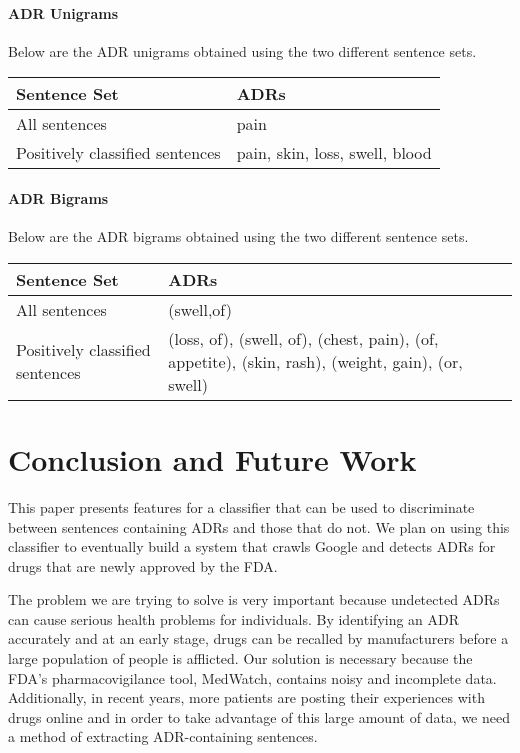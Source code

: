 \documentclass{acm_proc_article-sp}
\begin{document}
\paragraph{ADR Unigrams} Below are the ADR unigrams obtained using the two different sentence sets. 

\vspace{-3mm}
\tabcolsep=0.11cm
\begin{tabular}{| l | l |}
\hline
Sentence Set & ADRs \\ \hline
All sentences & pain \\ \hline
Positively classified sentences & pain, skin, loss, swell, blood \\ \hline
\end{tabular} 

\paragraph{ADR Bigrams} Below are the ADR bigrams obtained using the two different sentence sets. 

\vspace{-3mm}
\tabcolsep=0.11cm
\begin{tabular}{| p{2cm} | p{6cm} |}
\hline
Sentence Set & ADRs \\ \hline
All sentences & (swell,of) \\ \hline
Positively classified sentences & (loss, of), (swell, of), (chest, pain), (of, appetite), (skin, rash), (weight, gain), (or, swell) \\ \hline
\end{tabular} 

\section{Conclusion and Future Work}
This paper presents features for a classifier that can be used to discriminate between sentences containing ADRs and those that do not. We plan on using this classifier to eventually build a system that crawls Google and detects ADRs for drugs that are newly approved by the FDA. 

The problem we are trying to solve is very important because undetected ADRs can cause serious health problems for individuals. By identifying an ADR accurately and at an early stage, drugs can be recalled by manufacturers before a large population of people is afflicted. Our solution is necessary because the FDA's pharmacovigilance tool, MedWatch, contains noisy and incomplete data. Additionally, in recent years, more patients are posting their experiences with drugs online and in order to take advantage of this large amount of data, we need a method of extracting ADR-containing sentences.
\end{document}
